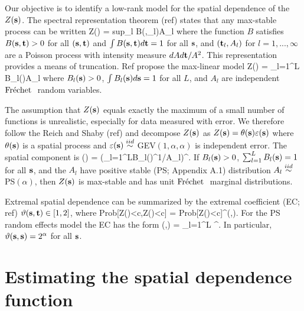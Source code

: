 \documentclass[11pt]{article}
\begin{document}
Our objective is to identify a low-rank model for the spatial dependence of the $Z(\mbox{\bf s})$.   The spectral representation theorem (ref) states that any max-stable process can be written
\beq\label{spectral}
  Z(\bs) = \mbox{sup}_l B(\bs,\bt_l)A_{l}
\eeq
where the function $B$ satisfies $B(\mbox{\bf s},\mbox{\bf t})>0$ for all $(\mbox{\bf s},\mbox{\bf t})$ and $\int B(\mbox{\bf s},\mbox{\bf t})d\mbox{\bf t}=1$ for all $\mbox{\bf s}$, and $(\mbox{\bf t}_l,A_l)$ for $l=1,...,\infty$ are a Poisson process with intensity measure $dA d\mbox{\bf t}/A^2$.    This representation provides a means of truncation.  Ref propose the max-linear model
\beq\label{spectral}
Z(\bs) = \bigvee_{l=1}^L B_{l}(\bs)A_l
\eeq
where $B_{l}(\mbox{\bf s})>0$, $\int B_l(\mbox{\bf s})d\mbox{\bf s}=1$ for all $L$, and $A_l$ are independent $\mbox{Fr$\acute{\mbox{e}}$chet }$ random variables.


The assumption that $Z(\mbox{\bf s})$ equals exactly the maximum of a small number of functions is unrealistic, especially for data measured with error.  We therefore follow the Reich and Shaby (ref) and decompose  $Z(\mbox{\bf s})$ as $Z(\mbox{\bf s})=\theta(\mbox{\bf s})\varepsilon(\mbox{\bf s})$ where $\theta(\mbox{\bf s})$ is a spatial process and $\varepsilon(\mbox{\bf s})\stackrel{iid}{\sim}$ GEV$(1,\alpha,\alpha)$ is independent error.  The spatial component is
\beq \label{theta}
  \theta(\bs) = \left(\sum_{l=1}^LB_{l}(\bs)^{1/\alpha}A_{l}\right)^{\alpha}.
\eeq
If $B_{l}(\mbox{\bf s})>0$, $\sum_{l=1}^LB_{l}(\mbox{\bf s})=1$ for all $\mbox{\bf s}$, and the $A_{l}$ have positive stable (PS; Appendix A.1) distribution $A_{l}\stackrel{iid}{\sim}$ PS$(\alpha)$, then $Z(\mbox{\bf s})$ is max-stable and has unit $\mbox{Fr$\acute{\mbox{e}}$chet }$ marginal distributions.

Extremal spatial dependence can be summarized by the extremal coefficient (EC; ref) $\vartheta(\mbox{\bf s},\mbox{\bf t})\in[1,2]$, where
\beq\label{ECdev}
  \mbox{Prob}[Z(\bs)<c,Z(\bt)<c] = \mbox{Prob}[Z(\bs)<c]^{\vartheta(\bs,\bt)}.
\eeq
For the PS random effects model the EC has the form
\beq\label{EC}
   \vartheta(\bs,\bt) = \sum_{l=1}^L ^\alpha.
\eeq
In particular, $\vartheta(\mbox{\bf s},\mbox{\bf s}) = 2^{\alpha}$ for all $\mbox{\bf s}$.

\section{Estimating the spatial dependence function}\label{s:estimation}
\end{document}
